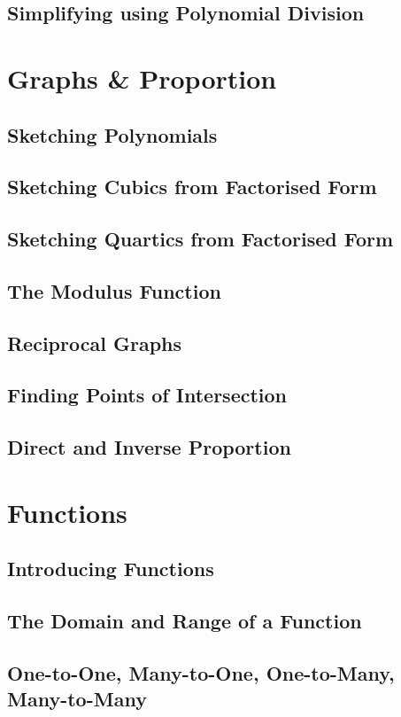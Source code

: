 \documentclass[../maths.tex]{subfiles}
\begin{document}
\subsection*{Simplifying using Polynomial Division}
\section{Graphs \& Proportion}
\subsection*{Sketching Polynomials}
\subsection*{Sketching Cubics from Factorised Form}
\subsection*{Sketching Quartics from Factorised Form}
\subsection*{The Modulus Function}
\subsection*{Reciprocal Graphs}
\subsection*{Finding Points of Intersection}
\subsection*{Direct and Inverse Proportion}
\section{Functions}
\subsection*{Introducing Functions}
\subsection*{The Domain and Range of a Function}
\subsection*{One-to-One, Many-to-One, One-to-Many, Many-to-Many}
\end{document}
